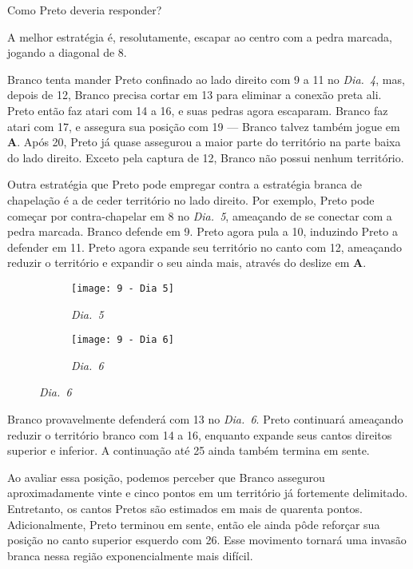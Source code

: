 Como Preto deveria responder?

A melhor estratégia é, resolutamente, escapar ao centro com a pedra marcada, jogando a diagonal de 8.

Branco tenta mander Preto confinado ao lado direito com 9 a 11 no \emph{Dia.\@~4}, mas, depois de 12, Branco precisa cortar em 13 para eliminar a conexão preta ali. Preto então faz atari com 14 a 16, e suas pedras agora escaparam. Branco faz atari com 17, e assegura sua posição com 19 --- Branco talvez também jogue em \textbf{A}. Após 20, Preto já quase assegurou a maior parte do território na parte baixa do lado direito. Exceto pela captura de 12, Branco não possui nenhum território.

\pagebreak

Outra estratégia que Preto pode empregar contra a estratégia branca de chapelação é a de ceder território no lado direito. Por exemplo, Preto pode começar por contra-chapelar em 8 no \emph{Dia.\@~5}, ameaçando de se conectar com a pedra marcada. Branco defende em 9. Preto agora pula a 10, induzindo Preto a defender em 11. Preto agora expande seu território no canto com 12, ameaçando reduzir o território e expandir o seu ainda mais, através do deslize em \textbf{A}.

\begin{figure}[h!]
    \centering
    \begin{subfigure}[t]{.45\textwidth}
        \texttt{[image: 9 - Dia 5]}
        \caption*{\emph{Dia.\@~5}}
    \end{subfigure}
    \hspace{1cm}
    \begin{subfigure}[t]{.45\textwidth}
        \texttt{[image: 9 - Dia 6]}
        \caption*{\emph{Dia.\@~6}}
    \end{subfigure}
\end{figure}

Branco provavelmente defenderá com 13 no \emph{Dia.\@~6}. Preto continuará ameaçando reduzir o território branco com 14 a 16, enquanto expande seus cantos direitos superior e inferior. A continuação até 25 ainda também termina em sente.

Ao avaliar essa posição, podemos perceber que Branco assegurou aproximadamente vinte e cinco pontos em um território já fortemente delimitado. Entretanto, os cantos Pretos são estimados em mais de quarenta pontos. Adicionalmente, Preto terminou em sente, então ele ainda pôde reforçar sua posição no canto superior esquerdo com 26. Esse movimento tornará uma invasão branca nessa região exponencialmente mais difícil.

